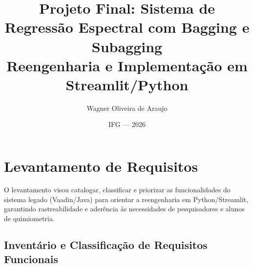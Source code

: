 \documentclass[12pt,a4paper]{article}
\begin{document}
\title{\textbf{Projeto Final: Sistema de Regressão Espectral com Bagging e Subagging}\\
\small Reengenharia e Implementação em Streamlit/Python}
\author{Wagner Oliveira de Araujo}
\date{IFG --- 2026}
\maketitle
\thispagestyle{empty}

\newpage
\tableofcontents
\newpage

\section{Levantamento de Requisitos}

O levantamento visou catalogar, classificar e priorizar as funcionalidades do sistema legado (Vaadin/Java) para orientar a reengenharia em Python/Streamlit, garantindo rastreabilidade e aderência às necessidades de pesquisadores e alunos de quimiometria.

\subsection{Inventário e Classificação de Requisitos Funcionais}
\end{document}
